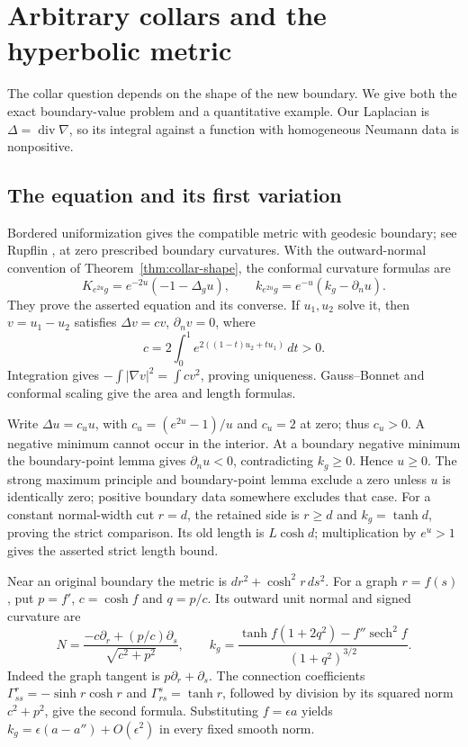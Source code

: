 \documentclass[11pt,a4paper]{article}
\theoremstyle{definition}
\begin{document}
\section{Arbitrary collars and the hyperbolic metric}\label{sec:collars}
The collar question depends on the shape of the new boundary. We give both the exact boundary-value problem and a quantitative example. Our Laplacian is $\Delta=\operatorname{div}\nabla$, so its integral against a function with homogeneous Neumann data is nonpositive.

\subsection{The equation and its first variation}
Bordered uniformization gives the compatible metric with geodesic boundary; see Rupflin \cite[Lemma~2.1, p.~3120]{Rupflin}, at zero prescribed boundary curvatures. With the outward-normal convention of Theorem~\ref{thm:collar-shape}, the conformal curvature formulas are
\[
 K_{e^{2u}g}=e^{-2u}(-1-\Delta_g u),\qquad
 k_{e^{2u}g}=e^{-u}(k_g-\partial_nu).
\]
They prove the asserted equation and its converse. If $u_1,u_2$ solve it, then $v=u_1-u_2$ satisfies $\Delta v=cv$, $\partial_nv=0$, where
\[
 c=2\int_0^1e^{2((1-t)u_2+tu_1)}\,dt>0.
\]
Integration gives $-\int|\nabla v|^2=\int cv^2$, proving uniqueness. Gauss--Bonnet and conformal scaling give the area and length formulas.

Write $\Delta u=c_u u$, with $c_u=(e^{2u}-1)/u$ and $c_u=2$ at zero; thus $c_u>0$. A negative minimum cannot occur in the interior. At a boundary negative minimum the boundary-point lemma gives $\partial_nu<0$, contradicting $k_g\ge0$. Hence $u\ge0$. The strong maximum principle and boundary-point lemma exclude a zero unless $u$ is identically zero; positive boundary data somewhere excludes that case. For a constant normal-width cut $r=d$, the retained side is $r\ge d$ and $k_g=\tanh d$, proving the strict comparison. Its old length is $L\cosh d$; multiplication by $e^u>1$ gives the asserted strict length bound.

Near an original boundary the metric is $dr^2+\cosh^2r\,ds^2$. For a graph $r=f(s)$, put $p=f'$, $c=\cosh f$ and $q=p/c$. Its outward unit normal and signed curvature are
\begin{equation}\label{eq:collar-graph}
 N=\frac{-c\partial_r+(p/c)\partial_s}{\sqrt{c^2+p^2}},\qquad
 k_g=\frac{\tanh f(1+2q^2)-f''\operatorname{sech}^2f}
               {(1+q^2)^{3/2}}.
\end{equation}
Indeed the graph tangent is $p\partial_r+\partial_s$. The connection coefficients $\Gamma^r_{ss}=-\sinh r\cosh r$ and $\Gamma^s_{rs}=\tanh r$, followed by division by its squared norm $c^2+p^2$, give the second formula. Substituting $f=\epsilon a$ yields $k_g=\epsilon(a-a'')+O(\epsilon^2)$ in every fixed smooth norm.
\end{document}
